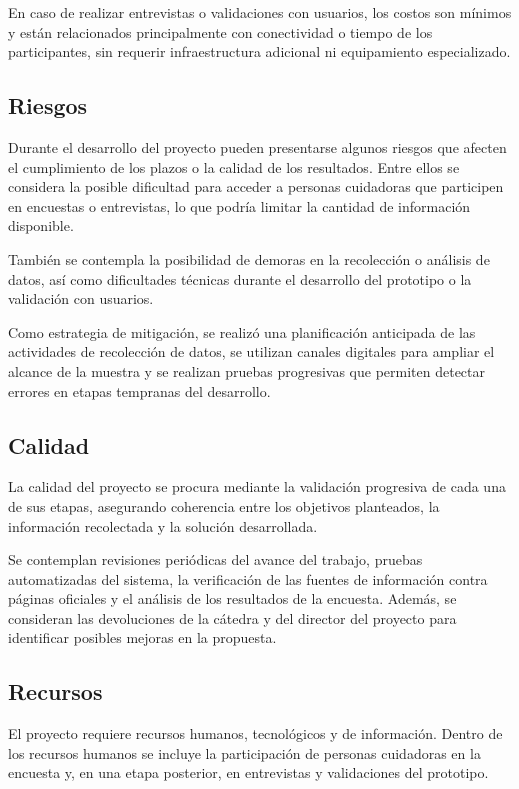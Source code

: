 En caso de realizar entrevistas o validaciones con usuarios, los costos son mínimos y están relacionados principalmente con conectividad o tiempo de los participantes, sin requerir infraestructura adicional ni equipamiento especializado.

\subsection{Riesgos}

Durante el desarrollo del proyecto pueden presentarse algunos riesgos que afecten el cumplimiento de los plazos o la calidad de los resultados. Entre ellos se considera la posible dificultad para acceder a personas cuidadoras que participen en encuestas o entrevistas, lo que podría limitar la cantidad de información disponible.

También se contempla la posibilidad de demoras en la recolección o análisis de datos, así como dificultades técnicas durante el desarrollo del prototipo o la validación con usuarios.

Como estrategia de mitigación, se realizó una planificación anticipada de las actividades de recolección de datos, se utilizan canales digitales para ampliar el alcance de la muestra y se realizan pruebas progresivas que permiten detectar errores en etapas tempranas del desarrollo.

\subsection{Calidad}

La calidad del proyecto se procura mediante la validación progresiva de cada una de sus etapas, asegurando coherencia entre los objetivos planteados, la información recolectada y la solución desarrollada.

Se contemplan revisiones periódicas del avance del trabajo, pruebas automatizadas del sistema, la verificación de las fuentes de información contra páginas oficiales y el análisis de los resultados de la encuesta. Además, se consideran las devoluciones de la cátedra y del director del proyecto para identificar posibles mejoras en la propuesta.

\subsection{Recursos}

El proyecto requiere recursos humanos, tecnológicos y de información. Dentro de los recursos humanos se incluye la participación de personas cuidadoras en la encuesta y, en una etapa posterior, en entrevistas y validaciones del prototipo.

